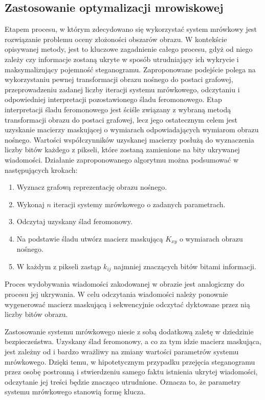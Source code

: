 {{        \subsection{Zastosowanie optymalizacji mrowiskowej}
        {
            Etapem procesu, w którym zdecydowano się wykorzystać system mrówkowy jest rozwiązanie problemu oceny
            złożoności obszarów obrazu. W kontekście opisywanej metody, jest to kluczowe zagadnienie całego procesu,
            gdyż od niego zależy czy informacje zostaną ukryte w sposób utrudniający ich wykrycie i maksymalizujący
            pojemność steganogramu. Zaproponowane podejście polega na wykorzystaniu pewnej transformacji obrazu nośnego
            do postaci grafowej, przeprowadzeniu zadanej liczby iteracji systemu mrówkowego, odczytaniu i odpowiedniej
            interpretacji pozostawionego śladu feromonowego. Etap interpretacji śladu feromonowego jest ściśle związany
            z wybraną metodą transformacji obrazu do postaci grafowej, lecz jego ostatecznym celem jest uzyskanie
            macierzy maskującej o wymiarach odpowiadających wymiarom obrazu nośnego. Wartości współczynników uzyskanej
            macierzy posłużą do wyznaczenia liczby bitów każdego z pikseli, które zostaną zamienione na bity ukrywanej
            wiadomości. Działanie zaproponowanego algorytmu można podsumować w następujących krokach:

            \begin{enumerate}
                \item Wyznacz grafową reprezentację obrazu nośnego.
                \item Wykonaj $n$ iteracji systemy mrówkowego o zadanych parametrach.
                \item Odczytaj uzyskany ślad feromonowy.
                \item Na podstawie śladu utwórz macierz maskującą $K_{xy}$ o wymiarach obrazu nośnego.
                \item W każdym z pikseli zastąp $k_{ij}$ najmniej znaczących bitów bitami informacji.
            \end{enumerate}

            Proces wydobywania wiadomości zakodowanej w obrazie jest analogiczny do procesu jej ukrywania. W celu
            odczytania wiadomości należy ponownie wygenerować macierz maskującą i sekwencyjnie odczytać dyktowane przez
            nią liczby bitów obrazu.

            Zastosowanie systemu mrówkowego niesie z sobą dodatkową zaletę w dziedzinie bezpieczeństwa. Uzyskany ślad
            feromonowy, a co za tym idzie macierz maskująca, jest zależny od i bardzo wrażliwy na zmiany wartości
            parametrów systemu mrówkowego. Dzięki temu, w hipotetycznym przypadku przejęcia steganogramu przez osobę
            postronną i stwierdzeniu samego faktu istnienia ukrytej wiadomości, odczytanie jej treści będzie znacząco
            utrudnione. Oznacza to, że parametry systemu mrówkowego stanowią formę klucza.
        }
    }

}
